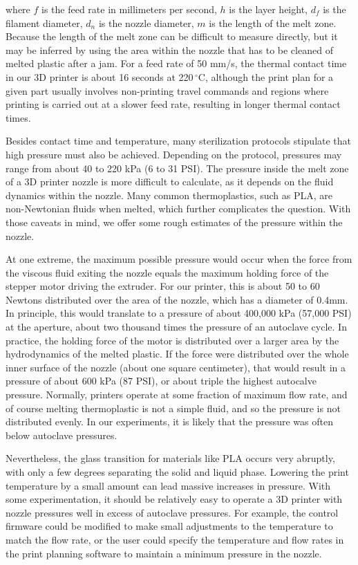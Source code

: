 \begin{refsection}
\noindent where $f$ is the feed rate in millimeters per second, $h$ is
the layer height, $d_f$ is the filament diameter, $d_n$ is the nozzle
diameter, $m$ is the length of the melt zone. Because the length of
the melt zone can be difficult to measure directly, but it may be
inferred by using the area within the nozzle that has to be cleaned of
melted plastic after a jam. For a feed rate of 50 mm/s, the thermal
contact time in our 3D printer is about 16 seconds at
220$\,^{\circ}\mathrm{C}$, although the print plan for a given part
usually involves non-printing travel commands and regions where
printing is carried out at a slower feed rate, resulting in longer
thermal contact times.

Besides contact time and temperature, many sterilization protocols
stipulate that high pressure must also be achieved. Depending on the
protocol, pressures may range from about 40 to 220 kPa (6 to 31
PSI). The pressure inside the melt zone of a 3D printer nozzle is more
difficult to calculate, as it depends on the fluid dynamics within the
nozzle. Many common thermoplastics, such as PLA, are non-Newtonian
fluids when melted, which further complicates the question. With those
caveats in mind, we offer some rough estimates of the pressure within
the nozzle.

At one extreme, the maximum possible pressure would occur when the
force from the viscous fluid exiting the nozzle equals the maximum
holding force of the stepper motor driving the extruder. For our
printer, this is about 50 to 60 Newtons distributed over the area of
the nozzle, which has a diameter of 0.4mm. In principle, this would
translate to a pressure of about 400,000 kPa (57,000 PSI) at the
aperture, about two thousand times the pressure of an autoclave
cycle. In practice, the holding force of the motor is distributed over
a larger area by the hydrodynamics of the melted plastic. If the force
were distributed over the whole inner surface of the nozzle (about one
square centimeter), that would result in a pressure of about 600 kPa
(87 PSI), or about triple the highest autocalve pressure. Normally,
printers operate at some fraction of maximum flow rate, and of course
melting thermoplastic is not a simple fluid, and so the pressure is
not distributed evenly. In our experiments, it is likely that the
pressure was often below autoclave pressures.

Nevertheless, the glass transition for materials like PLA occurs very
abruptly, with only a few degrees separating the solid and liquid
phase. Lowering the print temperature by a small amount can lead
massive increases in pressure. With some experimentation, it should be
relatively easy to operate a 3D printer with nozzle pressures well in
excess of autoclave pressures. For example, the control firmware could
be modified to make small adjustments to the temperature to match the
flow rate, or the user could specify the temperature and flow rates in
the print planning software to maintain a minimum pressure in the
nozzle.


\end{refsection}
